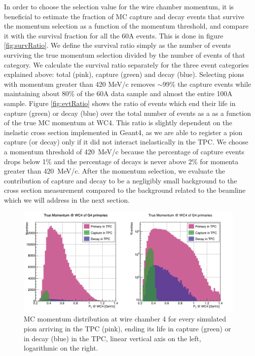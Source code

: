 In order to choose the selection value for the wire chamber momentum, it is beneficial to estimate the fraction of MC capture and decay events that survive the momentum selection as a function of the momentum threshold, and compare it with the survival fraction for all the 60A events. This is done in figure \ref{fig:survRatio}. We define the survival ratio simply  as the number of events surviving the true momentum selection divided by the number of events of that category. We calculate the survival ratio separately for the three event categories explained above: total (pink), capture (green) and decay (blue).
Selecting pions with momentum greater than 420 MeV/c removes $\sim$99\% the capture events while maintaining about 80\% of the 60A data sample and almost the entire 100A sample. 
Figure \ref{fig:evtRatio} shows the ratio of events which end their life in capture (green) or decay (blue) over the total number of events as a as a function of the true MC momentum at WC4. This ratio is slightly dependent on the inelastic cross section implemented in Geant4, as we are able to register a pion capture (or decay) only if it did not interact inelastically in the TPC. We choose a momentum threshold of 420~MeV/c because the percentage of capture events drops below 1\% and the percentage of decays is never above 2\% for momenta greater than 420~MeV/c. After the momentum selection, we evaluate the contribution of capture and decay to be a negligibly small background to the cross section measurement compared to the background related to the beamline which we will address in the next section.

\begin{figure}[]
\centering
\includegraphics[width=15cm]{Chapter-7/Images/CDAsMomentumFunct.png}
\caption{MC momentum distribution at wire chamber 4 for every simulated pion arriving in the TPC (pink), ending its life in capture (green) or in decay (blue) in the TPC, linear vertical axis on the left, logarithmic on the right. }
\label{fig:CaptureMom}
\end{figure}

